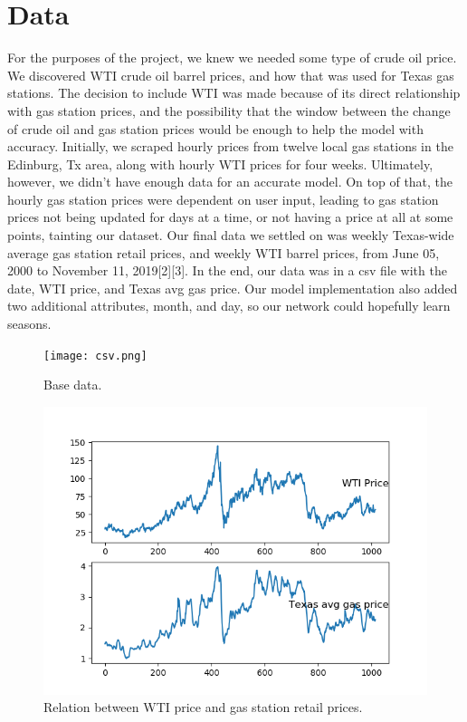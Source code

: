 \documentclass[conference]{IEEEtran}
\begin{document}
\section{Data}

For the purposes of the project, we knew we needed some type of crude oil price. We discovered WTI crude oil barrel prices, and how that was used for Texas gas stations. The decision to include WTI was made because of its direct relationship with gas station prices, and the possibility that the window between the change of crude oil and gas station prices would be enough to help the model with accuracy. Initially, we scraped hourly prices from twelve local gas stations in the Edinburg, Tx area, along with hourly WTI prices for four weeks. Ultimately, however, we didn’t have enough data for an accurate model. On top of that, the hourly gas station prices were dependent on user input, leading to gas station prices not being updated for days at a time, or not having a price at all at some points, tainting our dataset. Our final data we settled on was weekly Texas-wide average gas station retail prices, and weekly WTI barrel prices, from June 05, 2000 to November 11, 2019[2][3]. In the end, our data was in a csv file with the date, WTI price, and Texas avg gas price. Our model implementation also added two additional attributes, month, and day, so our network could hopefully learn seasons. 

\begin{figure}[htbp]
\texttt{[image: csv.png]}
\caption{Base data.}
\label{fig}
\end{figure}

\begin{figure}[htbp]
\includegraphics[width=.99\linewidth]{WTI to GasStation relation.png}
\caption{Relation between WTI price and gas station retail prices.}
\label{fig}
\end{figure}
\end{document}

